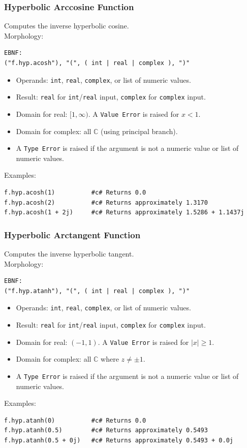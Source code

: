 \subsubsection{Hyperbolic Arccosine Function}
Computes the inverse hyperbolic cosine. \\
Morphology:
\begin{verbatim}
EBNF:
("f.hyp.acosh"), "(", ( int | real | complex ), ")"
\end{verbatim}
\begin{itemize}
\item Operands: \texttt{int}, \texttt{real}, \texttt{complex}, or list of numeric values.
\item Result: \texttt{real} for \texttt{int}/\texttt{real} input, \texttt{complex} for \texttt{complex} input.
\item Domain for real: $[1, \infty)$. A \texttt{Value Error} is raised for $x < 1$.
\item Domain for complex: all $\mathbb{C}$ (using principal branch).
\item A \texttt{Type Error} is raised if the argument is not a numeric value or list of numeric values.
\end{itemize}
Examples:
\begin{verbatim}
f.hyp.acosh(1)          #c# Returns 0.0
f.hyp.acosh(2)          #c# Returns approximately 1.3170
f.hyp.acosh(1 + 2j)     #c# Returns approximately 1.5286 + 1.1437j
\end{verbatim}

\subsubsection{Hyperbolic Arctangent Function}
Computes the inverse hyperbolic tangent. \\
Morphology:
\begin{verbatim}
EBNF:
("f.hyp.atanh"), "(", ( int | real | complex ), ")"
\end{verbatim}
\begin{itemize}
\item Operands: \texttt{int}, \texttt{real}, \texttt{complex}, or list of numeric values.
\item Result: \texttt{real} for \texttt{int}/\texttt{real} input, \texttt{complex} for \texttt{complex} input.
\item Domain for real: $(-1, 1)$. A \texttt{Value Error} is raised for $|x| \geq 1$.
\item Domain for complex: all $\mathbb{C}$ where $z \neq \pm 1$.
\item A \texttt{Type Error} is raised if the argument is not a numeric value or list of numeric values.
\end{itemize}
Examples:
\begin{verbatim}
f.hyp.atanh(0)          #c# Returns 0.0
f.hyp.atanh(0.5)        #c# Returns approximately 0.5493
f.hyp.atanh(0.5 + 0j)   #c# Returns approximately 0.5493 + 0.0j
\end{verbatim}

